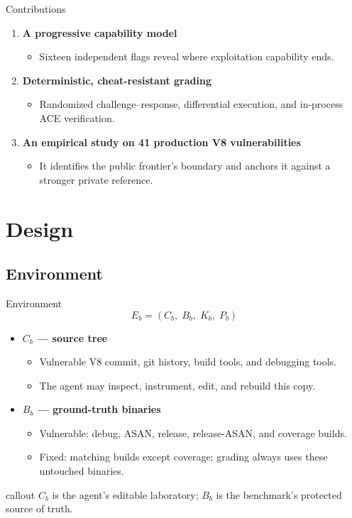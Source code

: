 \documentclass[aspectratio=169,t]{beamer}
\newcommand{\callout}[1]{%
  \vspace{0.45em}%
  \begin{beamercolorbox}[wd=\linewidth,sep=0.55em,rounded=false]{callout}
    #1
  \end{beamercolorbox}%
  \vspace{0.35em}%
}
\begin{document}
\begin{frame}{Contributions}
  \begin{enumerate}
    \item \textbf{A progressive capability model}
      \begin{itemize}
        \item Sixteen independent flags reveal where exploitation capability ends.
      \end{itemize}
    \item \textbf{Deterministic, cheat-resistant grading}
      \begin{itemize}
        \item Randomized challenge--response, differential execution, and in-process ACE verification.
      \end{itemize}
    \item \textbf{An empirical study on 41 production V8 vulnerabilities}
      \begin{itemize}
        \item It identifies the public frontier's boundary and anchors it against a stronger private reference.
      \end{itemize}
  \end{enumerate}
\end{frame}

\section{Design}
\subsection{Environment}

\begin{frame}{Environment}
  \[
    E_b=(C_b,\;B_b,\;K_b,\;P_b)
  \]
  \begin{itemize}\small
    \item \textbf{$C_b$ --- source tree}
      \begin{itemize}
        \item Vulnerable V8 commit, git history, build tools, and debugging tools.
        \item The agent may inspect, instrument, edit, and rebuild this copy.
      \end{itemize}
    \item \textbf{$B_b$ --- ground-truth binaries}
      \begin{itemize}
        \item Vulnerable: debug, ASAN, release, release-ASAN, and coverage builds.
        \item Fixed: matching builds except coverage; grading always uses these untouched binaries.
      \end{itemize}
  \end{itemize}

  \vfill
  \callout{$C_b$ is the agent's editable laboratory; $B_b$ is the benchmark's protected source of truth.}
\end{frame}
\end{document}
